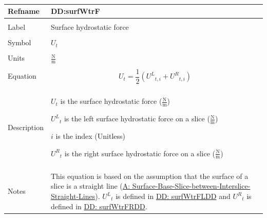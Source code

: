 \documentclass[12pt]{article}
\begin{document}
\par~

\noindent \begin{minipage}{\textwidth}
\begin{tabular}{p{} p{}}
\toprule \textbf{Refname} & \textbf{DD:surfWtrF}
\label{DD:surfWtrF}
\\ \midrule \\
Label & Surface hydrostatic force
        \\ \midrule \\
        Symbol & ${U_{t}}$
                 \\ \midrule \\
                 Units & $\frac{\text{N}}{\text{m}}$
                         \\ \midrule \\
                         Equation & \begin{displaymath}
                                    {U_{t}}=\frac{1}{2} \left({{U^{L}}_{t,i}}+{{U^{R}}_{t,i}}\right)
                                    \end{displaymath}
                                    \\ \midrule \\
                                    Description & \begin{symbDescription}
                                                  \item{${U_{t}}$ is the surface hydrostatic force ($\frac{\text{N}}{\text{m}}$)}
                                                  \item{${{U^{L}}_{t}}$ is the left surface hydrostatic force on a slice ($\frac{\text{N}}{\text{m}}$)}
                                                  \item{$i$ is the index (Unitless)}
                                                  \item{${{U^{R}}_{t}}$ is the right surface hydrostatic force on a slice ($\frac{\text{N}}{\text{m}}$)}
                                                  \end{symbDescription}
                                                  \\ \midrule \\
                                                  Notes & This equation is based on the assumption that the surface of a slice is a straight line (\hyperref[assumpSBSBISL]{A: Surface-Base-Slice-between-Interslice-Straight-Lines}). ${{U^{L}}_{t}}$ is defined in \hyperref[DD:surfWtrFLDD]{DD: surfWtrFLDD} and ${{U^{R}}_{t}}$ is defined in \hyperref[DD:surfWtrFRDD]{DD: surfWtrFRDD}.

\end{tabular}
\end{minipage}
\end{document}
